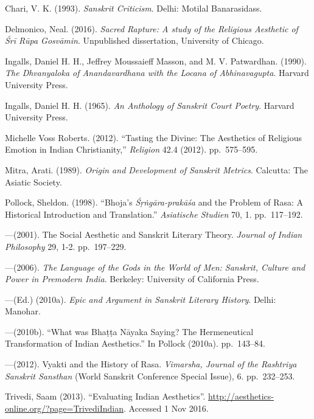 \newpage

\begin{thebibliography}{99}
\itemsep=2pt
Chari, V. K. (1993). \textsl{Sanskrit Criticism}. Delhi: Motilal Banarasidass.

Delmonico, Neal. (2016). \textsl{Sacred Rapture: A study of the Religious Aesthetic of Śrī Rūpa Gosvāmin}. Unpublished dissertation, University of Chicago.

Ingalls, Daniel H. H., Jeffrey Moussaieff Masson, and M. V. Patwardhan. (1990). \textsl{The Dhvanyaloka of Anandavardhana with the Locana of Abhinavagupta}. Harvard University Press.

Ingalls, Daniel H. H. (1965). \textsl{An Anthology of Sanskrit Court Poetry}. Harvard University Press.

Michelle Voss Roberts. (2012). ``Tasting the Divine: The Aesthetics of Religious Emotion in Indian Christianity,'' \textsl{Religion} 42.4 (2012). pp.~575--595.

Mitra, Arati. (1989). \textsl{Origin and Development of Sanskrit Metrics}. Calcutta: The Asiatic Society.

Pollock, Sheldon. (1998). ``Bhoja's \textsl{Śṛṅgāra-prakāśa} and the Problem of Rasa: A Historical Introduction and Translation.'' \textsl{Asiatische Studien} 70, 1. pp.~117--192. 

---\kern3pt(2001). The Social Aesthetic and Sanskrit Literary Theory. \textsl{Journal of Indian Philosophy} 29, 1-2. pp.~197--229.

---\kern3pt(2006). \textsl{The Language of the Gods in the World of Men: Sanskrit, Culture and Power in Premodern India}. Berkeley: University of California Press.

---\kern3pt(Ed.) (2010a). \textsl{Epic and Argument in Sanskrit Literary History}. Delhi: Manohar.

---\kern3pt(2010b). ``What was Bhaṭṭa Nāyaka Saying? The Hermeneutical Transformation of Indian Aesthetics.'' In Pollock (2010a). pp.~143--84.

---\kern3pt(2012). Vyakti and the History of Rasa. \textsl{Vimarsha, Journal of the Rashtriya Sanskrit Sansthan} (World Sanskrit Conference Special Issue), 6. pp.~232--253.

Trivedi, Saam (2013). ``Evaluating Indian Aesthetics''. \url{http://aesthetics-online.org/?page=TrivediIndian}. Accessed 1 Nov 2016.
\end{thebibliography}

\label{chapter\thechapter:end}
